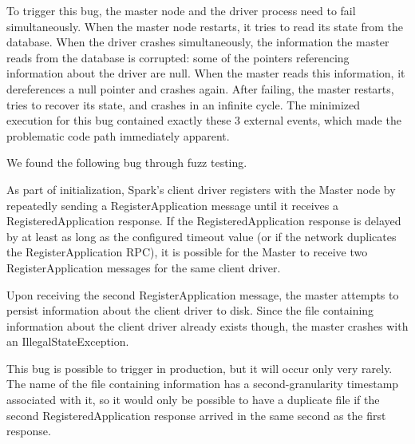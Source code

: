 To trigger this bug, the master node and the driver process need to fail
simultaneously. When the master node restarts, it tries to read its state from
the database. When the driver crashes simultaneously, the
information the master reads from the database is corrupted: some of
the pointers referencing information about the driver are null. When the
master reads this information, it dereferences a null pointer and crashes
again. After failing, the master restarts, tries to recover its state, and
crashes in an infinite cycle. The minimized execution for this bug contained
exactly these 3 external events, which made the problematic code path immediately apparent.

 We found the
following bug through fuzz testing.

As part of
initialization, Spark's client driver registers with the Master node by repeatedly sending a RegisterApplication
  message until it receives a RegisteredApplication response.
 If the RegisteredApplication response is delayed by at least as long as the
 configured timeout value (or if the network
  duplicates the RegisterApplication RPC), it is possible for the Master to receive two RegisterApplication
  messages for the same client driver.

Upon receiving the second RegisterApplication message, the master attempts to
persist information about the client driver
to disk. Since the file containing information about the client driver already exists though, the master crashes with an
IllegalStateException.

This bug is possible to trigger in production, but it will occur only very
rarely. The name of the file containing information has a second-granularity timestamp associated
with it, so it would only be possible to have a duplicate file if the second
RegisteredApplication response arrived in the same second as the first
response.
